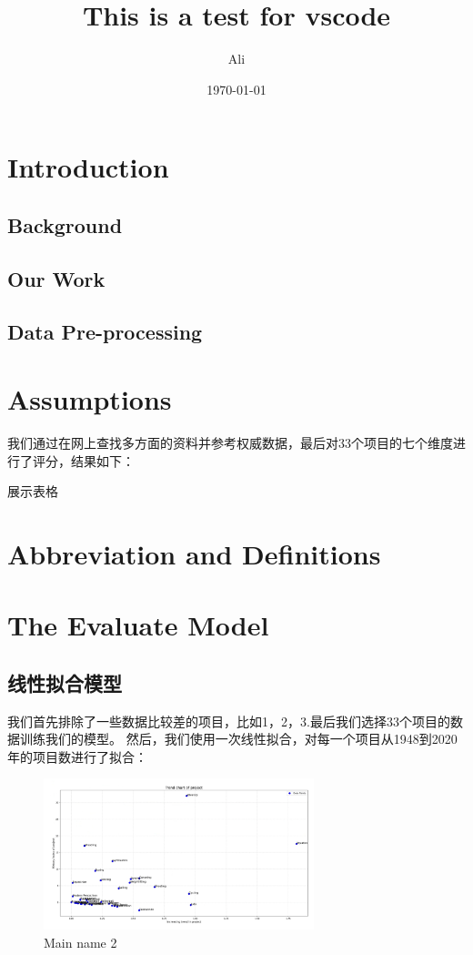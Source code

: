 \documentclass[a4paper]{article}
\title{ This is a test for vscode}
\author{ Ali}
\date{\today}
\begin{document}
    \maketitle
\begin{abstract}
    \lipsum[2]
\end{abstract}
\tableofcontents
\section{Introduction}
\subsection{Background}
\subsection{Our Work}
\subsection{Data Pre-processing}


\section{Assumptions}
我们通过在网上查找多方面的资料并参考权威数据，最后对33个项目的七个维度进行了评分，结果如下：

展示表格

\section{Abbreviation and Definitions}
\section{The Evaluate Model}
\subsection{线性拟合模型}
我们首先排除了一些数据比较差的项目，比如1，2，3.最后我们选择33个项目的数据训练我们的模型。
然后，我们使用一次线性拟合，对每一个项目从1948到2020年的项目数进行了拟合：
\begin{figure}[H] %
    \centering %
    \includegraphics[width=0.7\textwidth]{TrendChartOfProject} %
    \caption{Main name 2} %
    \label{Fig.main2} %
    \end{figure}
\end{document}
